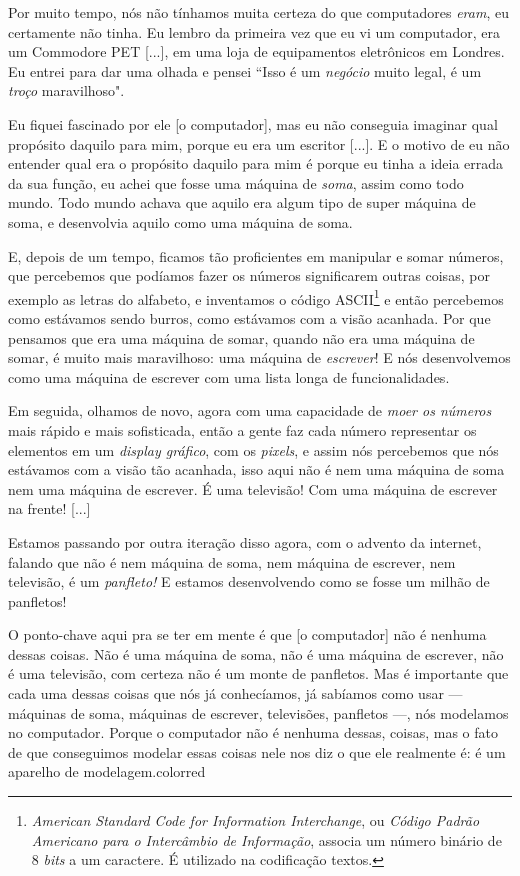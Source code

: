 \begin{citacao}
    Por muito tempo, nós não tínhamos muita certeza do que computadores \textit{eram}, eu certamente não tinha. Eu lembro da primeira vez que eu vi um computador, era um Commodore PET [...], em uma loja de equipamentos eletrônicos em Londres. Eu entrei para dar uma olhada e pensei ``Isso é um \textit{negócio} muito legal, é um \textit{troço} maravilhoso". 
    
    Eu fiquei fascinado por ele [o computador], mas eu não conseguia imaginar qual propósito daquilo para mim, porque eu era um escritor [...]. E o motivo de eu não entender qual era o propósito daquilo para mim é porque eu tinha a ideia errada da sua função, eu achei que fosse uma máquina de \textit{soma}, assim como todo mundo. Todo mundo achava que aquilo era algum tipo de super máquina de soma, e desenvolvia aquilo como uma máquina de soma.
    
    E, depois de um tempo, ficamos tão proficientes em manipular e somar números, que percebemos que podíamos fazer os números significarem outras coisas, por exemplo as letras do alfabeto, e inventamos o código ASCII\footnote{\textit{American Standard Code for Information Interchange}, ou \textit{Código Padrão Americano para o Intercâmbio de Informação}, associa um número binário de 8 \textit{bits} a um caractere. É utilizado na codificação textos.} e então percebemos como estávamos sendo burros, como estávamos com a visão acanhada. Por que pensamos que era uma máquina de somar, quando não era uma máquina de somar, é muito mais maravilhoso: uma máquina de \textit{escrever}! E nós desenvolvemos como uma máquina de escrever com uma lista longa de funcionalidades.
    
    Em seguida, olhamos de novo, agora com uma capacidade de \textit{moer os números} mais rápido e mais sofisticada, então a gente faz cada número representar os elementos em um \textit{display gráfico}, com os \textit{pixels}, e assim nós percebemos que nós estávamos com a visão tão acanhada, isso aqui não é nem uma máquina de soma nem uma máquina de escrever. É uma televisão! Com uma máquina de escrever na frente! [...]
    
    Estamos passando por outra iteração disso agora, com o advento da internet, falando que não é nem máquina de soma, nem máquina de escrever, nem televisão, é um \textit{panfleto!} E estamos desenvolvendo como se fosse um milhão de panfletos!
    
    O ponto-chave aqui pra se ter em mente é que [o computador] não é nenhuma dessas coisas. Não é uma máquina de soma, não é uma máquina de escrever, não é uma televisão, com certeza não é um monte de panfletos. Mas é importante que cada uma dessas coisas que nós já conhecíamos, já sabíamos como usar --- máquinas de soma, máquinas de escrever, televisões, panfletos ---, nós modelamos no computador. Porque o computador não é nenhuma dessas, coisas, mas o fato de que conseguimos modelar essas coisas nele nos diz o que ele realmente é: é um aparelho de modelagem.{color{red}
    ~ \cite[após 34 minutos, tradução própria]{adams1996-1}}
\end{citacao}